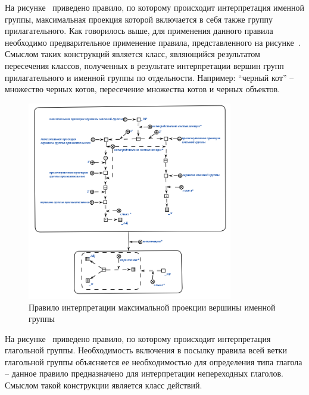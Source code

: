 На рисунке~\textit{} приведено правило, по которому происходит интерпретация именной группы, максимальная проекция которой включается в себя также группу прилагательного.
Как говорилось выше, для применения данного правила необходимо предварительное применение правила, представленного на рисунке~\textit{}.
Смыслом таких конструкций является класс, являющийся результатом пересечения классов, полученных в результате интерпретации вершин групп прилагательного и именной группы по отдельности. Например: ``черный кот''{} -- множество черных котов, пересечение множества котов и черных объектов. %

\begin{figure}[h]
    \centering
    \includegraphics[width=0.8\textwidth]{images/part2/chapter_lang/d_sem_2.png}
    \caption{Правило интерпретации максимальной проекции вершины именной группы}
    \label{fig:d_sem_2}
\end{figure}

На рисунке~\textit{} приведено правило, по которому происходит интерпретация глагольной группы. Необходимость включения в посылку правила всей ветки глагольной группы объясняется ее необходимостью для определения типа глагола -- данное правило предназначено для интерпретации непереходных глаголов. Смыслом такой конструкции является класс действий.


